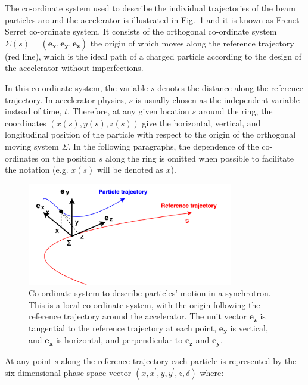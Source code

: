 The co-ordinate system used to describe the individual trajectories of the beam particles around the accelerator is illustrated in Fig.~\ref{fig:coordinate_system} and it is known as Frenet-Serret co-ordinate system.  It consists of the orthogonal co-ordinate system $\Sigma(s) = (\mathbf{e_x}, \mathbf{e_y}, \mathbf{e_z})$ the origin of which moves along the reference trajectory (red line), which is the ideal path of a charged particle according to the design of the accelerator without imperfections.

In this co-ordinate system, the variable $s$ denotes the distance along the reference trajectory. In accelerator physics, $s$ is usually chosen as the independent variable instead of time, $t$.  %
Therefore, at any given location $s$ around the ring, the coordinates $(x(s), y(s), z(s))$ give the horizontal, vertical, and longitudinal position of the particle with respect to the origin of the orthogonal moving system $\Sigma$. In the following paragraphs, the dependence of the co-ordinates on the position $s$ along the ring is omitted when possible to facilitate the notation (e.g. $x(s)$ will be denoted as $x$).

\begin{figure}[!h] %
    \centering         
    \includegraphics[width=0.8\textwidth]{images/Ch2/coordinates_particle_motion.png}
        \caption{Co-ordinate system to describe particles' motion in a synchrotron. This is a local co-ordinate system, with the origin following the reference trajectory around the accelerator.  The unit vector $\mathbf{e_z}$ is tangential to the reference trajectory at each point, $\mathbf{e_y}$ is vertical, and $\mathbf{e_x}$ is horizontal, and perpendicular to $\mathbf{e_z}$ and $\mathbf{e_y}$.}
        \label{fig:coordinate_system}
 \end{figure}


 At any point $s$ along the reference trajectory each particle is represented by the six-dimensional phase space vector $(x, x^{\prime}, y, y^{\prime}, z, \delta)$ where:

